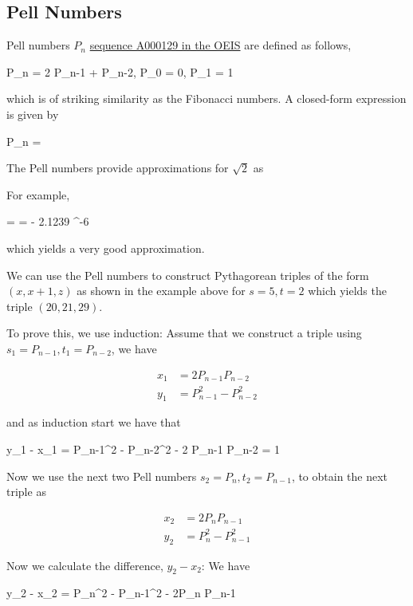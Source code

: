 \subsection{Pell Numbers}

Pell numbers $P_n$ \href{https://oeis.org/A000129}{sequence A000129 in the OEIS} are defined as follows,

\bee
P_n = 2 P_{n-1} + P_{n-2}, \quad P_0 = 0, P_1 = 1
\eee

which is of striking similarity as the Fibonacci numbers. A closed-form expression is given by

\bee
P_n = 
\eee

The Pell numbers provide approximations for $\sqrt{2}$ as

\bee
{} \approx {}
\eee

For example, 

\bee
{} =   =  - 2.1239 ^{-6}
\eee

which yields a very good approximation.

We can use the Pell numbers to construct Pythagorean triples of the form $(x, x+1, z)$ as shown in the example above for $s = 5, t=2$ which yields the triple $(20, 21, 29)$.

To prove this, we use induction: Assume that we construct a triple using $s_1 = P_{n-1}, t_1 = P_{n-2}$, we have

\begin{align*}
    x_1 &= 2P_{n-1} P_{n-2} \\
    y_1 &= P_{n-1}^2 - P_{n-2}^2
\end{align*}

and as induction start we have that

\be\label{2023-04-12:eq1}
y_1 - x_1 = P_{n-1}^2 - P_{n-2}^2 - 2 P_{n-1} P_{n-2} = 1
\ee

Now we use the next two Pell numbers $s_2 = P_{n}, t_2 = P_{n-1}$, to obtain the next triple as

\begin{align*}
    x_2 &= 2P_{n} P_{n-1} \\
    y_2 &= P_{n}^2 - P_{n-1}^2
\end{align*}

Now we calculate the difference, $y_2 - x_2$: We have

\bee
    y_2 - x_2 = P_{n}^2 - P_{n-1}^2 - 2P_{n} P_{n-1}
\eee

